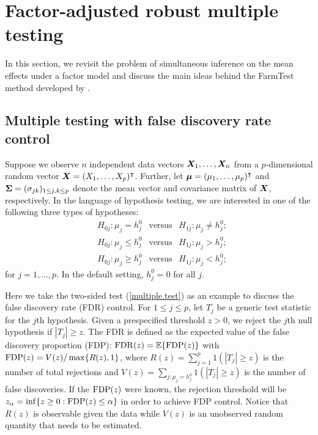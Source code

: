 \section[Factor-adjusted robust multiple testing]{Factor-adjusted robust multiple testing}\label{sec:methods}
In this section, we revisit the problem of simultaneous inference on the mean effects under a factor model and discuss the main ideas behind the FarmTest method developed by \cite{FKSZ2017}.


\subsection{Multiple testing with false discovery rate control}





Suppose we observe $n$ independent data vectors $\bm{X}_{1}, \ldots, \bm{X}_n$ from a $p$-dimensional random vector $\bm{X}= (X_1, \ldots, X_p)^\intercal$. Further, let $\bm{\mu} = (\mu_1, \ldots, \mu_p)^\intercal$ and $\bm{\Sigma} = (\sigma_{jk})_{1\leq   j, k\leq  p}$ denote the mean vector and covariance matrix of $\bm{X}$, respectively. In the language of hypothesis testing, we are interested in one of the following three types of hypotheses:
  \begin{align}  \label{multiple.test}
	& H_{0j} :  \mu_j = h_j^0 \ \ \mbox{ versus } \ \ H_{1j}: \mu_j \neq h_j^0 ;
	\\
	\label{multiple_1}
		& H_{0j} :  \mu_j \leq h_j^0 \ \ \mbox{ versus } \ \ H_{1j}: \mu_j > h_j^0 ;
		 \\
		 \label{multiple_2}
			& H_{0j} :  \mu_j \geq h_j^0 \ \ \mbox{ versus } \ \ H_{1j}: \mu_j < h_j^0 ;
\end{align}
for $ j= 1, \ldots, p$.
In the default setting, $h_j^0 = 0$ for all $j$.

Here we take the two-sided test (\ref{multiple.test}) as an example to discuss the false discovery rate (FDR) control. For $1\leq j\leq p$, let $T_j$ be a generic test statistic for the $j$th hypothesis. Given a prespecified threshold $z>0$, we reject the $j$th null hypothesis if $|T_j| \geq  z$. The FDR is defined as the expected value of the false discovery proportion (FDP): ${\rm FDR}(z) = \mathbb{E}\{ {\rm FDP}(z)\} $ with ${\rm FDP}(z)= V(z)/ \max\{R(z),1\}$, where $R(z) = \sum_{j=1}^p 1 ( |T_j | \geq  z ) $ is the number of total rejections and $V(z) = \sum_{j: \mu_j = h_j^0} 1  ( |T_j| \geq z ) $ is the number of false discoveries. If the ${\rm FDP}(z)$ were known, the rejection threshold will be $z_\alpha = \inf \{ z\geq 0 :  {\rm FDP}(z) \leq  \alpha  \}$ in order to achieve FDP control.
Notice that $R(z)$ is observable given the data while $V(z)$ is an unobserved random quantity that needs to be estimated.

